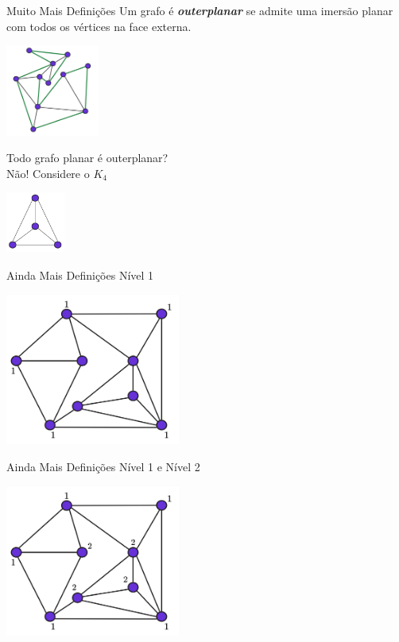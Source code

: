 \begin{frame}{Muito Mais Definições}
    \centering
    \large
    Um grafo é \textbf{\emph{outerplanar}} se admite uma imersão planar com todos os vértices na face externa.
    \bigbreak
    \begin{minipage}{\linewidth}
        \centering
        \includegraphics[height=3cm]{images/outerplanar.jpg}
    \end{minipage}
    \pause\bigbreak
    Todo grafo planar é outerplanar?\\
    \pause
    Não! Considere o $K_4$
    \bigbreak
    \begin{minipage}{\linewidth}
        \centering
        \includegraphics[height=2cm]{images/k4_graph.jpg}
    \end{minipage}
\end{frame}

\begin{frame}{Ainda Mais Definições}
    \centering
    \LARGE
    Nível 1
    \bigbreak
    \begin{minipage}{\linewidth}
        \centering
        \includegraphics[height=5cm]{images/k_outerplanar_1.jpg}
    \end{minipage}
\end{frame}

\begin{frame}{Ainda Mais Definições}
    \centering
    \LARGE
    Nível 1 e Nível 2
    \begin{minipage}{\linewidth}
        \centering
        \includegraphics[height=5cm]{images/k_outerplanar_2.jpg}
    \end{minipage}
\end{frame}

